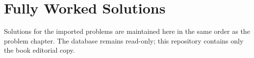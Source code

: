 \chapter{Fully Worked Solutions}
\label{ch:solutions}

Solutions for the imported problems are maintained here in the same order as the problem chapter. The database remains read-only; this repository contains only the book editorial copy.
